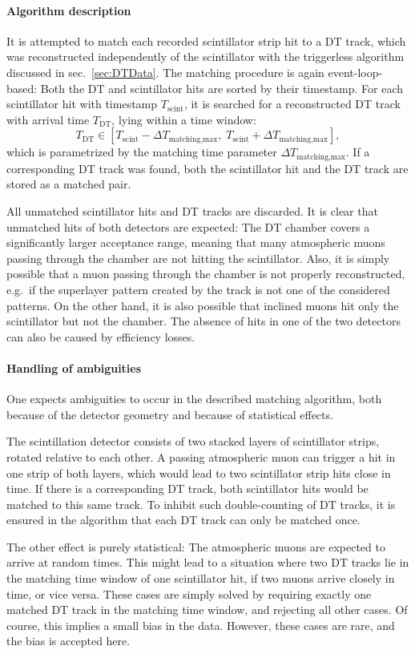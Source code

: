\paragraph{Algorithm description}
It is attempted to match each recorded scintillator strip hit to a \ac{DT} track, which was reconstructed independently of the scintillator with the triggerless algorithm discussed in sec.\ \ref{sec:DTData}. The matching procedure is again event-loop-based: Both the \ac{DT} and scintillator hits are sorted by their timestamp. For each scintillator hit with timestamp $T_\text{scint}$, it is searched for a reconstructed \ac{DT} track with arrival time $T_\text{DT}$, lying within a time window:
\begin{equation}
    T_\text{DT} \in [T_\text{scint}-\Delta T_\text{matching,max} ,\; T_\text{scint}+\Delta T_\text{matching,max}],
    \label{eq:Combined-MatchingCriterion}
\end{equation}
which is parametrized by the matching time parameter $\Delta T_\text{matching,max}$. If a corresponding \ac{DT} track was found, both the scintillator hit and the \ac{DT} track are stored as a matched pair.
\par All unmatched scintillator hits and \ac{DT} tracks are discarded. It is clear that unmatched hits of both detectors are expected: The \ac{DT} chamber covers a significantly larger acceptance range, meaning that many atmospheric muons passing through the chamber are not hitting the scintillator. Also, it is simply possible that a muon passing through the chamber is not properly reconstructed, e.g.\ if the superlayer pattern created by the track is not one of the considered patterns. On the other hand, it is also possible that inclined muons hit only the scintillator but not the chamber. The absence of hits in one of the two detectors can also be caused by efficiency losses.
\paragraph{Handling of ambiguities}
One expects ambiguities to occur in the described matching algorithm, both because of the detector geometry and because of statistical effects.
\par The scintillation detector consists of two stacked layers of scintillator strips, rotated relative to each other. A passing atmospheric muon can trigger a hit in one strip of both layers, which would lead to two scintillator strip hits close in time. If there is a corresponding \ac{DT} track, both scintillator hits would be matched to this same track. To inhibit such double-counting of \ac{DT} tracks, it is ensured in the algorithm that each \ac{DT} track can only be matched once.
\par The other effect is purely statistical: The atmospheric muons are expected to arrive at random times. This might lead to a situation where two \ac{DT} tracks lie in the matching time window of one scintillator hit, if two muons arrive closely in time, or vice versa. These cases are simply solved by requiring exactly one matched \ac{DT} track in the matching time window, and rejecting all other cases. Of course, this implies a small bias in the data. However, these cases are rare, and the bias is accepted here.
